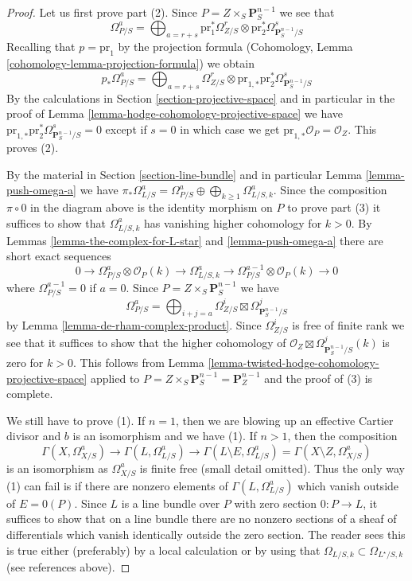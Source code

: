 \documentclass[10pt,a4paper]{amsart}
\theoremstyle{plain}
\theoremstyle{definition}
\theoremstyle{remark}
\numberwithin{equation}{subsection}
\begin{document}
\begin{proof}
Let us first prove part (2). Since
$P = Z \times_S \mathbf{P}^{n - 1}_S$
we see that
$$
\Omega^a_{P/S} = \bigoplus\nolimits_{a = r + s}
\text{pr}_1^*\Omega^r_{Z/S} \otimes
\text{pr}_2^*\Omega^s_{\mathbf{P}^{n - 1}_S/S}
$$
Recalling that $p = \text{pr}_1$ by the projection formula
(Cohomology, Lemma \ref{cohomology-lemma-projection-formula})
we obtain
$$
p_*\Omega^a_{P/S} = \bigoplus\nolimits_{a = r + s}
\Omega^r_{Z/S} \otimes
\text{pr}_{1, *}\text{pr}_2^*\Omega^s_{\mathbf{P}^{n - 1}_S/S}
$$
By the calculations in Section \ref{section-projective-space}
and in particular in
the proof of Lemma \ref{lemma-hodge-cohomology-projective-space}
we have $\text{pr}_{1, *}\text{pr}_2^*\Omega^s_{\mathbf{P}^{n - 1}_S/S} = 0$
except if $s = 0$ in which case we get
$\text{pr}_{1, *}\mathcal{O}_P = \mathcal{O}_Z$.
This proves (2).

\medskip\noindent
By the material in Section \ref{section-line-bundle} and in particular
Lemma \ref{lemma-push-omega-a} we have
$\pi_*\Omega^a_{L/S} = \Omega^a_{P/S} \oplus
\bigoplus_{k \geq 1} \Omega^a_{L/S, k}$.
Since the composition $\pi \circ 0$ in the diagram above
is the identity morphism on $P$ to prove part (3) it suffices to show that
$\Omega^a_{L/S, k}$ has vanishing higher cohomology for $k > 0$.
By Lemmas \ref{lemma-the-complex-for-L-star} and \ref{lemma-push-omega-a}
there are short exact sequences
$$
0 \to \Omega^a_{P/S} \otimes \mathcal{O}_P(k)
\to \Omega^a_{L/S, k} \to
\Omega^{a - 1}_{P/S} \otimes \mathcal{O}_P(k) \to 0
$$
where $\Omega^{a - 1}_{P/S} = 0$ if $a = 0$. Since
$P = Z \times_S \mathbf{P}^{n - 1}_S$ we have
$$
\Omega^a_{P/S} = \bigoplus\nolimits_{i + j = a}
\Omega^i_{Z/S} \boxtimes \Omega^j_{\mathbf{P}^{n - 1}_S/S}
$$
by Lemma \ref{lemma-de-rham-complex-product}.
Since $\Omega^i_{Z/S}$ is free of finite rank
we see that it suffices to show that the higher cohomology of
$\mathcal{O}_Z \boxtimes \Omega^j_{\mathbf{P}^{n - 1}_S/S}(k)$
is zero for $k > 0$. This follows from
Lemma \ref{lemma-twisted-hodge-cohomology-projective-space}
applied to $P = Z \times_S \mathbf{P}^{n - 1}_S = \mathbf{P}^{n - 1}_Z$
and the proof of (3) is complete.

\medskip\noindent
We still have to prove (1). If $n = 1$, then we are blowing
up an effective Cartier divisor and $b$ is an isomorphism
and we have (1). If $n > 1$, then the composition
$$
\Gamma(X, \Omega^a_{X/S})
\to
\Gamma(L, \Omega^a_{L/S})
\to
\Gamma(L \setminus E, \Omega^a_{L/S})
=
\Gamma(X \setminus Z, \Omega^a_{X/S})
$$
is an isomorphism as $\Omega^a_{X/S}$ is finite free
(small detail omitted). Thus the only way (1) can fail is if
there are nonzero elements of $\Gamma(L, \Omega^a_{L/S})$ which vanish
outside of $E = 0(P)$. Since $L$ is a line bundle over $P$
with zero section $0 : P \to L$, it suffices to show that
on a line bundle there are no nonzero sections of a sheaf
of differentials which vanish identically outside the zero section.
The reader sees this is true either (preferably) by a local calculation
or by using that $\Omega_{L/S, k} \subset \Omega_{L^\star/S, k}$
(see references above).
\end{proof}
\end{document}
